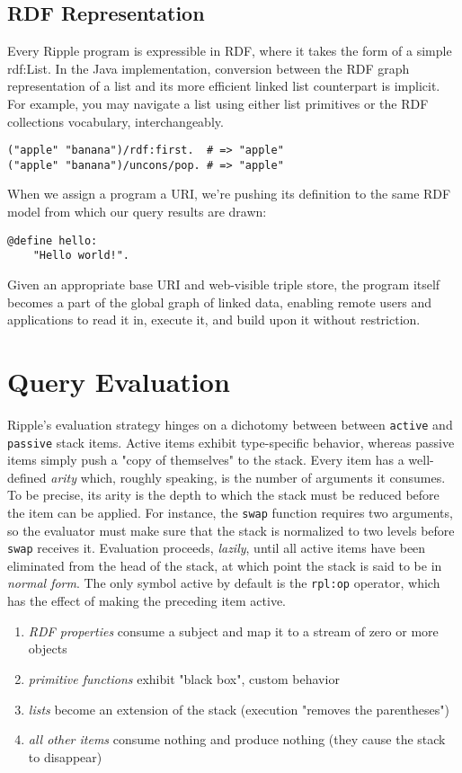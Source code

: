 \documentclass[runningheads]{llncs}
\begin{document}
\subsection{RDF Representation}
Every Ripple program is expressible in RDF, where it takes the form of a simple rdf:List.  In the Java implementation, conversion between the RDF graph representation of a list and its more efficient linked list counterpart is implicit.  For example, you may navigate a list using either list primitives or the RDF collections vocabulary, interchangeably.
\begin{verbatim}
("apple" "banana")/rdf:first.  # => "apple"
("apple" "banana")/uncons/pop. # => "apple"
\end{verbatim}

When we assign a program a URI, we're pushing its definition to the same RDF model from which our query results are drawn:
\begin{verbatim}
@define hello:
    "Hello world!".
\end{verbatim}

Given an appropriate base URI and web-visible triple store, the program itself becomes a part of the global graph of linked data, enabling remote users and applications to read it in, execute it, and build upon it without restriction.


\section{Query Evaluation}

Ripple's evaluation strategy hinges on a dichotomy between between \texttt{active} and \texttt{passive} stack items.  Active items exhibit type-specific behavior, whereas passive items simply push a "copy of themselves" to the stack.  Every item has a well-defined \textit{arity} which, roughly speaking, is the number of arguments it consumes.  To be precise, its arity is the depth to which the stack must be reduced before the item can be applied.  For instance, the \texttt{swap} function requires two arguments, so the evaluator must make sure that the stack is normalized to two levels before \texttt{swap} receives it.  Evaluation proceeds, \textit{lazily}, until all active items have been eliminated from the head of the stack, at which point the stack is said to be in \textit{normal form}.  The only symbol active by default is the \texttt{rpl:op} operator, which has the effect of making the preceding item active.
\begin{enumerate}
\item \textit{RDF properties} consume a subject and map it to a stream of zero or more objects
\item \textit{primitive functions} exhibit "black box", custom behavior
\item \textit{lists} become an extension of the stack (execution "removes the parentheses")
\item \textit{all other items} consume nothing and produce nothing (they cause the stack to disappear)
\end{enumerate}
\end{document}
